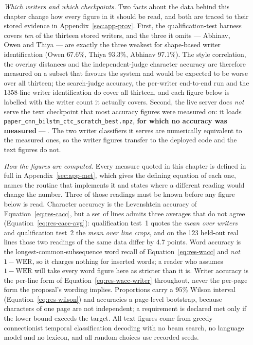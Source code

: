 \emph{Which writers and which checkpoints.}
Two facts about the data behind this chapter change how every figure in it should be read, and both are traced to their stored evidence in Appendix~\ref{sec:app-prov}.
First, the qualification-test harness covers \emph{ten} of the thirteen stored writers, and the three it omits --- Abhinav, Owen and Thiya --- are exactly the three weakest for shape-based writer identification (Owen 67.6\%, Thiya 93.3\%, Abhinav 97.1\%).
The style correlation, the overlay distances and the independent-judge character accuracy are therefore measured on a subset that favours the system and would be expected to be worse over all thirteen; the search-judge accuracy, the per-writer end-to-end run and the 1358-line writer identification do cover all thirteen, and each figure below is labelled with the writer count it actually covers.
Second, the live server does \emph{not} serve the text checkpoint that most accuracy figures were measured on: it loads \texttt{paper\_cnn\_bilstm\_ctc\_scratch\_best.npz}, \textbf{for which no accuracy was measured} --- \nym{}.
The two writer classifiers it serves are numerically equivalent to the measured ones, so the writer figures transfer to the deployed code and the text figures do not.

\emph{How the figures are computed.}
Every measure quoted in this chapter is defined in full in Appendix~\ref{sec:app-met}, which gives the defining equation of each one, names the routine that implements it and states where a different reading would change the number.
Three of those readings must be known before any figure below is read.
Character accuracy is the Levenshtein accuracy of Equation~\ref{eq:res-cacc}, but a set of lines admits three averages that do not agree (Equation~\ref{eq:res-cacc-avg}): qualification test~1 quotes the \emph{mean over writers} and qualification test~2 the \emph{mean over line crops}, and on the 123 held-out real lines those two readings of the same data differ by 4.7 points.
Word accuracy is the longest-common-subsequence word recall of Equation~\ref{eq:res-wacc} and \emph{not} $1-\mathrm{WER}$, so it charges nothing for inserted words; a reader who assumes $1-\mathrm{WER}$ will take every word figure here as stricter than it is.
Writer accuracy is the per-line form of Equation~\ref{eq:res-wacc-writer} throughout, never the per-page form the proposal's wording implies.
Proportions carry a 95\% Wilson interval (Equation~\ref{eq:res-wilson}) and accuracies a page-level bootstrap, because characters of one page are not independent; a requirement is declared met only if the lower bound exceeds the target.
All text figures come from greedy connectionist temporal classification decoding with no beam search, no language model and no lexicon, and all random choices use recorded seeds.

